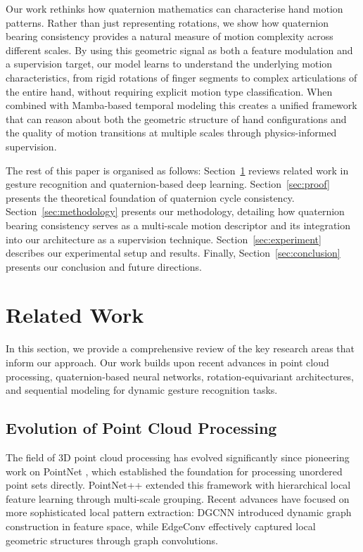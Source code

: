 \documentclass[journal]{IEEEtran}
\theoremstyle{plain}
\begin{document}
Our work rethinks how quaternion mathematics can characterise hand motion patterns. Rather than just representing rotations, we show how quaternion bearing consistency provides a natural measure of motion complexity across different scales. By using this geometric signal as both a feature modulation and a supervision target, our model learns to understand the underlying motion characteristics, from rigid rotations of finger segments to complex articulations of the entire hand, without requiring explicit motion type classification. When combined with Mamba-based temporal modeling this creates a unified framework that can reason about both the geometric structure of hand configurations and the quality of motion transitions at multiple scales through physics-informed supervision.

The rest of this paper is organised as follows: Section~\ref{sec:related_work} reviews related work in gesture recognition and quaternion-based deep learning.
Section~\ref{sec:proof} presents the theoretical foundation of quaternion cycle consistency. Section~\ref{sec:methodology} presents our methodology, detailing how quaternion bearing consistency serves as a multi-scale motion descriptor and its integration into our architecture as a supervision technique. Section~\ref{sec:experiment} describes our experimental setup and results. Finally, Section~\ref{sec:conclusion} presents our conclusion and future directions.
\section{Related Work}\label{sec:related_work}
In this section, we provide a comprehensive review of the key research areas that inform our approach. Our work builds upon recent advances in point cloud processing, quaternion-based neural networks, rotation-equivariant architectures, and sequential modeling for dynamic gesture recognition tasks.

\subsection{Evolution of Point Cloud Processing}
The field of 3D point cloud processing has evolved significantly since pioneering work on PointNet \cite{qi2017pointnet}, which established the foundation for processing unordered point sets directly. PointNet++ \cite{qi2017pointnet++} extended this framework with hierarchical local feature learning through multi-scale grouping. Recent advances have focused on more sophisticated local pattern extraction: DGCNN \cite{wang2019dynamic} introduced dynamic graph construction in feature space, while EdgeConv \cite{wang2019edgeconv} effectively captured local geometric structures through graph convolutions.
\end{document}
